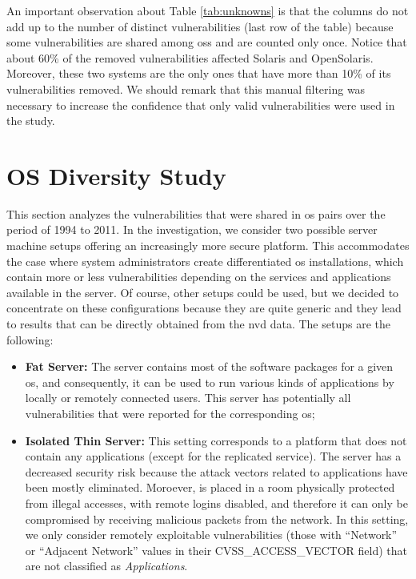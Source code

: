 An important observation about Table \ref{tab:unknowns} is that the columns do not add up to the number of distinct vulnerabilities (last row of the table) because some vulnerabilities are shared among \glspl{os} and are counted only once.
Notice that about 60\% of the removed vulnerabilities affected Solaris and OpenSolaris.
Moreover, these two systems are the only ones that have more than 10\% of its vulnerabilities removed.
We should remark that this manual filtering was necessary to increase the confidence that only valid vulnerabilities were used in the study.


\section{OS Diversity Study}\label{study}
This section analyzes the vulnerabilities that were shared in \gls{os} pairs over the period of 1994 to 2011. 
In the investigation, we consider two possible server machine setups offering an increasingly more secure platform. 
This accommodates the case where system administrators create differentiated \gls{os} installations, which contain more or less vulnerabilities depending on the services and applications available in the server. 
Of course, other setups could be used, but we decided to concentrate on these configurations because they are quite generic and they lead to results that can be directly obtained from the \gls{nvd} data. 
The setups are the following:

\begin{itemize}

\item \textbf{Fat Server:} The server contains most of the software packages for a given \gls{os}, and consequently, it can be used to run various kinds of applications by locally or remotely connected users. This server has potentially all vulnerabilities that were reported for the corresponding \gls{os};


\item \textbf{Isolated Thin Server:} This setting corresponds to a platform that does not contain any applications (except for the replicated service). 
The server has a decreased security risk because the attack vectors related to applications have been mostly eliminated. 
Moroever, is placed in a room physically protected from illegal accesses, with remote logins disabled, and therefore it can only be compromised by receiving malicious packets from the network. In this setting, we only consider remotely exploitable vulnerabilities (those with ``Network'' or ``Adjacent Network'' values in their CVSS\_ACCESS\_VECTOR field) that are not classified as \textit{Applications}.

\end{itemize}

